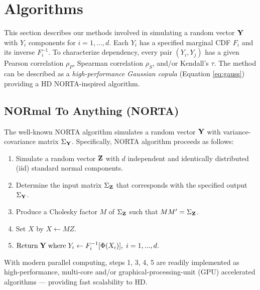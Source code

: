 \documentclass[
]{jss}
\providecommand{\tightlist}{%
  \setlength{\itemsep}{0pt}\setlength{\parskip}{0pt}}
\begin{document}
\clearpage

\hypertarget{algorithms}{%
\section{Algorithms}\label{algorithms}}

This section describes our methods involved in simulating a random vector \(\bf Y\) with \(Y_i\) components for \(i=1,\ldots,d\). Each \(Y_i\) has a specified marginal CDF \(F_i\) and its inverse \(F^{-1}_i\). To characterize dependency, every pair \((Y_i, Y_j)\) has a given Pearson correlation \(\rho_P\), Spearman correlation \(\rho_S\), and/or Kendall's \(\tau\). The method can be described as a \emph{high-performance Gaussian copula} (Equation \eqref{eq:gauss}) providing a HD NORTA-inspired algorithm.

\hypertarget{normal-to-anything-norta}{%
\subsection{NORmal To Anything (NORTA)}\label{normal-to-anything-norta}}

The well-known NORTA algorithm \citep{Cario1997} simulates a random vector \(\bf Y\) with variance-covariance matrix \(\Sigma_{\bf Y}\). Specifically, NORTA algorithm proceeds as follows:


\begin{enumerate}
\def\labelenumi{\arabic{enumi}.}
\tightlist
\item
  Simulate a random vector \(\bf Z\) with \(d\) independent and identically distributed (iid) standard normal components.
\item
  Determine the input matrix \(\Sigma_{\bf Z}\) that corresponds with the specified output \(\Sigma_{\bf Y}\).
\item
  Produce a Cholesky factor \(M\) of \(\Sigma_{\bf Z}\) such that \(M M^{\prime}=\Sigma_{\bf Z}\).
\item
  Set \(X\) by \(X \gets MZ\).
\item
  \(\text{Return} \; {\bf Y} \; \text{where} \; Y_i \gets F_i^{-1}[\Phi(X_i)], \; i=1,...,d\).
\end{enumerate}


With modern parallel computing, steps 1, 3, 4, 5 are readily implemented as high-performance, multi-core and/or graphical-processing-unit (GPU) accelerated algorithms --- providing fast scalability to HD.
\end{document}
